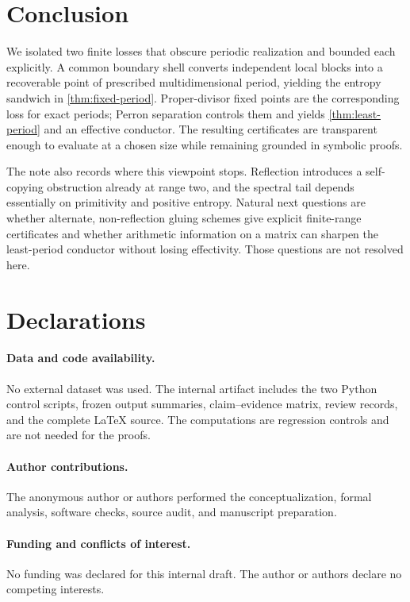 \section{Conclusion}
\label{sec:conclusion}

We isolated two finite losses that obscure periodic realization and bounded
each explicitly.  A common boundary shell converts independent local blocks
into a recoverable point of prescribed multidimensional period, yielding the
entropy sandwich in \cref{thm:fixed-period}.  Proper-divisor fixed points are
the corresponding loss for exact periods; Perron separation controls them
and yields \cref{thm:least-period} and an effective conductor.  The resulting
certificates are transparent enough to evaluate at a chosen size while
remaining grounded in symbolic proofs.

The note also records where this viewpoint stops.  Reflection introduces a
self-copying obstruction already at range two, and the spectral tail depends
essentially on primitivity and positive entropy.  Natural next questions are
whether alternate, non-reflection gluing schemes give explicit finite-range
certificates and whether arithmetic information on a matrix can sharpen the
least-period conductor without losing effectivity.  Those questions are not
resolved here.

\section*{Declarations}

\paragraph{Data and code availability.}
No external dataset was used.  The internal artifact includes the two Python
control scripts, frozen output summaries, claim--evidence matrix, review
records, and the complete \LaTeX{} source.  The computations are regression
controls and are not needed for the proofs.

\paragraph{Author contributions.}
The anonymous author or authors performed the conceptualization, formal
analysis, software checks, source audit, and manuscript preparation.

\paragraph{Funding and conflicts of interest.}
No funding was declared for this internal draft.  The author or authors
declare no competing interests.

